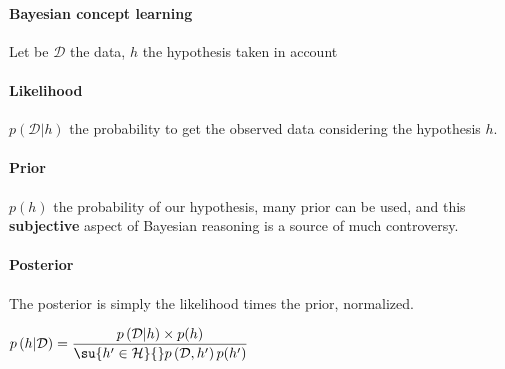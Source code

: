 \paragraph{Bayesian concept learning}
Let be $\mathcal{D}$ the data, $h$ the hypothesis taken in account
\paragraph{Likelihood}
$p\left(\mathcal{D}|h\right)$ the probability to get the observed data considering the 
hypothesis $h$.
\paragraph{Prior}
$p(h)$ the probability of our hypothesis, many prior can be used, and this 
\textbf{subjective} aspect of Bayesian reasoning is a source of much controversy.

\paragraph{Posterior}
The posterior is simply the likelihood times the prior, normalized.
\begin{center}
$p\left(h|\mathcal{D}\right) = \dfrac{p\left(\mathcal{D}|h\right)\times p(h)}{
    \su{h'\in\mathcal{H}}{}p\left(\mathcal{D}, h'\right)p(h')
}$
\end{center}

